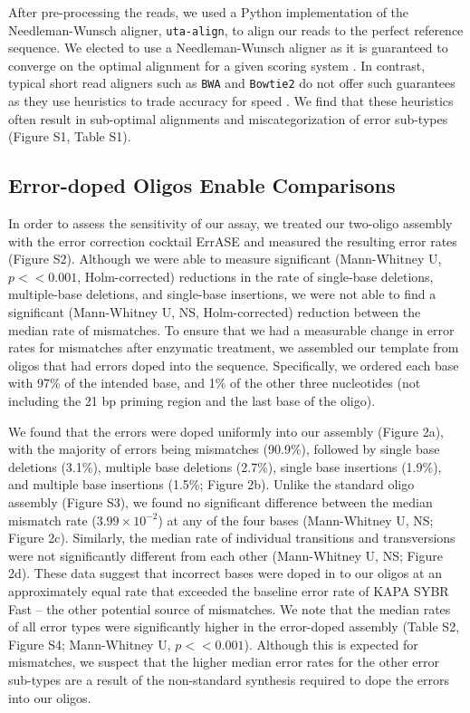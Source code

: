 \documentclass[twocolumn]{article}
\begin{document}
After pre-processing the reads, we used a Python implementation of the Needleman-Wunsch aligner, \texttt{uta-align}, to align our reads to the perfect reference sequence. We elected to use a Needleman-Wunsch aligner as it is guaranteed to converge on the optimal alignment for a given scoring system \cite{needleman1970,altschul1986}. In contrast, typical short read aligners such as \texttt{BWA} and \texttt{Bowtie2} do not offer such guarantees as they use heuristics to trade accuracy for speed \cite{li2010,langmead2012}. We find that these heuristics often result in sub-optimal alignments and miscategorization of error sub-types (Figure S1, Table S1).


\subsection*{Error-doped Oligos Enable Comparisons}

In order to assess the sensitivity of our assay, we treated our two-oligo assembly with the error correction cocktail ErrASE and measured the resulting error rates (Figure S2). Although we were able to measure significant (Mann-Whitney U, $p<<0.001$, Holm-corrected) reductions in the rate of single-base deletions, multiple-base deletions, and single-base insertions, we were not able to find a significant (Mann-Whitney U, NS, Holm-corrected) reduction between the median rate of mismatches. To ensure that we had a measurable change in error rates for mismatches after enzymatic treatment, we assembled our template from oligos that had errors doped into the sequence. Specifically, we ordered each base with 97\% of the intended base, and 1\% of the other three nucleotides (not including the 21 bp priming region and the last base of the oligo).

We found that the errors were doped uniformly into our assembly (Figure 2a), with the majority of errors being mismatches (90.9\%), followed by single base deletions (3.1\%), multiple base deletions (2.7\%), single base insertions (1.9\%), and multiple base insertions (1.5\%; Figure 2b). Unlike the standard oligo assembly (Figure S3), we found no significant difference between the median mismatch rate ($3.99\times10^{-2}$) at any of the four bases (Mann-Whitney U, NS; Figure 2c). Similarly, the median rate of individual transitions and transversions were not significantly different from each other (Mann-Whitney U, NS; Figure 2d). These data suggest that incorrect bases were doped in to our oligos at an approximately equal rate that exceeded the baseline error rate of KAPA SYBR Fast – the other potential source of mismatches. We note that the median rates of all error types were significantly higher in the error-doped assembly (Table S2, Figure S4; Mann-Whitney U, $p<<0.001$). Although this is expected for mismatches, we suspect that the higher median error rates for the other error sub-types are a result of the non-standard synthesis required to dope the errors into our oligos.
\end{document}
